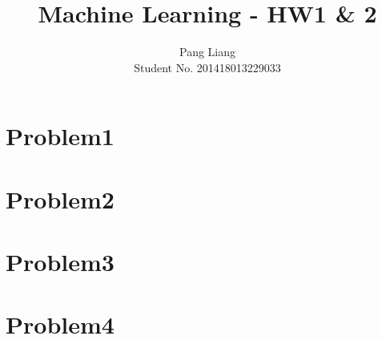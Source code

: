\documentclass[12pt]{article}
\title{Machine Learning - HW1 & 2}
\author{Pang Liang\\ Student No. 201418013229033}
\begin{document}
\maketitle

\section{Problem1}


\section{Problem2}


\section{Problem3}


\section{Problem4}
\end{document}
